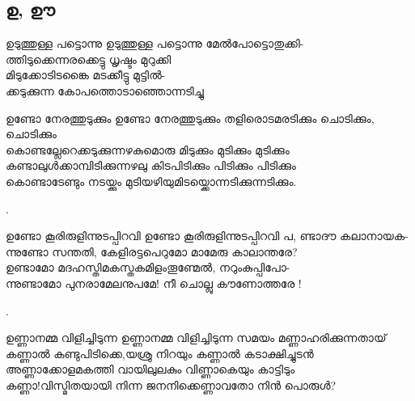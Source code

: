 \subsection{ഉ, ഊ}

\begin{enumerate}

\begin{slokam}{\VBh}{\PKV}{ഉടുത്തുള്ള പട്ടൊന്നു}
ഉടുത്തുള്ള പട്ടൊന്നു മേൽപോട്ടൊതുക്കി-\\
ത്തിടുക്കെന്നരക്കെട്ടു ധൃഷ്ടം മുറുക്കി\\
മിടുക്കോടിടങ്കൈ മടക്കീട്ടു മുട്ടിൽ-\\
ക്കടുക്കുന്ന കോപത്തൊടാഞ്ഞൊന്നടിച്ചു
\end{slokam}


\begin{slokam}{\VSr}{\Kund}{ഉണ്ടോ നേരത്തുടുക്കും}
ഉണ്ടോ നേരത്തുടുക്കും തളിരൊടമരടിക്കും ചൊടിക്കും, ചൊടിക്കും\\
കൊണ്ടല്ലേറെക്കടുക്കുന്നഴകുമൊരു മിടുക്കും മുടിക്കും മുടിക്കും\\
കണ്ടാലുള്‍ക്കാമ്പിടിക്കുന്നഴലു കിടപിടിക്കും പിടിക്കും പിടിക്കും\\
കൊണ്ടാടേണ്ടും നടയ്ക്കും മുടിയഴിയുമിടയ്ക്കൊന്നടിക്കുന്നടിക്കും.
\end{slokam}


.  


\begin{slokam}{\VSv}{\Unk}{ഉണ്ടോ കൂരിരുളിന്നുടപ്പിറവി}
ഉണ്ടോ കൂരിരുളിന്നുടപ്പിറവി പ, ണ്ടാദൗ കലാനായക-\\
ന്നുണ്ടോ സന്തതി, കേളിരട്ടപെറുമോ മാമേരു കാലാന്തരേ?\\
ഉണ്ടാമോ മദഹസ്തിമകസ്തകമിളംതൂണ്മേൽ, നറുംകുപ്പിപോ-\\
ന്നുണ്ടാമോ പുനരാമേലനുപമേ! നീ ചൊല്ലു കൗണോത്തരേ !
\end{slokam}


.

\begin{slokam}{\VSv}{\AUK}{ഉണ്ണാനമ്മ വിളിച്ചിടുന്ന}
ഉണ്ണാനമ്മ വിളിച്ചിടുന്ന സമയം മണ്ണാഹരിക്കുന്നതായ്\\
കണ്ണാല്‍ കണ്ടുപിടിക്കെ,യശ്രു നിറയും കണ്ണാല്‍ കടാക്ഷിച്ചുടന്‍\\
അണ്ണാക്കോളമകത്തി വായിലുലകും വിണ്ണാകെയും കാട്ടിടും\\
കണ്ണാ!വിസ്മിതയായി നിന്ന ജനനിക്കെണ്ണാവതോ നിന്‍ പൊരുള്‍? 
\end{slokam}


\end{enumerate}
